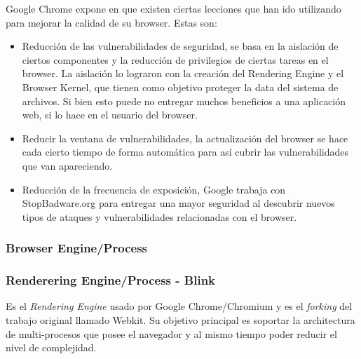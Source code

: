     Google Chrome expone en \cite{reis2009browser} que existen ciertas lecciones que han ido utilizando para mejorar la calidad de su browser. Estas son:

    \begin{itemize}
    	\item Reducción de las vulnerabilidades de seguridad, se basa en la aislación de ciertos componentes y la reducción de privilegios de ciertas tareas en el browser. La aislación lo lograron con la creación del Rendering Engine y el Browser Kernel, que tienen como objetivo proteger la data del sistema de archivos. Si bien esto puede no entregar muchos beneficios a una aplicación web, si lo hace en el usuario del browser.
    	\item Reducir la ventana de vulnerabilidades, la actualización del browser se hace cada cierto tiempo de forma automática para así cubrir las vulnerabilidades que van apareciendo.
    	\item Reducción de la frecuencia de exposición, Google trabaja con StopBadware.org para entregar una mayor seguridad al descubrir nuevos tipos de ataques y vulnerabilidades relacionadas con el browser.
    \end{itemize}

    \subsubsection{Browser Engine/Process}

    \subsubsection{Renderering Engine/Process - Blink}
     \label{chap2:Blink}
     Es el \textit{Rendering Engine} usado por Google Chrome/Chromium y es el \textit{forking} del trabajo original llamado Webkit. Su objetivo principal es soportar la architectura de multi-procesos que posee el navegador y al mismo tiempo poder reducir el nivel de complejidad.





